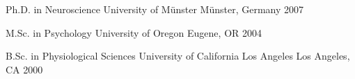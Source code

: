 \newpage
{}


\begin{cventries}

    \cventry
      {Ph.D. in Neuroscience} %
      {University of Münster} %
      {Münster, Germany} %
      {2007} %
      {}

    \cventry
      {M.Sc. in Psychology} %
      {University of Oregon} %
      {Eugene, OR} %
      {2004} %
      {}

    \cventry
      {B.Sc. in Physiological Sciences} %
      {University of California Los Angeles} %
      {Los Angeles, CA} %
      {2000} %
      {}
  \end{cventries}
